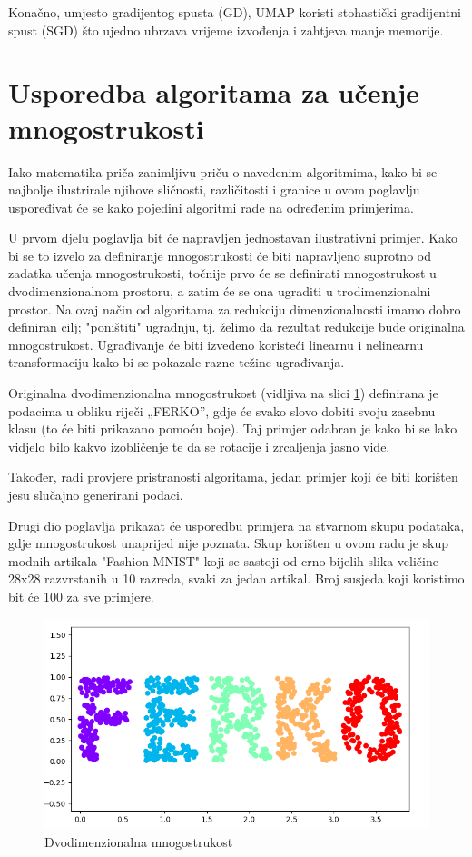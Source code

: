 \documentclass[times, utf8, diplomski]{fer}
\begin{document}
Konačno, umjesto gradijentog spusta (GD), UMAP koristi stohastički gradijentni spust (SGD) što ujedno ubrzava vrijeme izvođenja i zahtjeva manje memorije.

\section{Usporedba algoritama za učenje mnogostrukosti}

Iako matematika priča zanimljivu priču o navedenim algoritmima, kako bi se najbolje ilustrirale njihove sličnosti, različitosti i granice u ovom poglavlju uspoređivat će se kako pojedini algoritmi rade na određenim primjerima.

U prvom djelu poglavlja bit će napravljen jednostavan ilustrativni primjer. Kako bi se to izvelo za definiranje mnogostrukosti će biti napravljeno suprotno od zadatka učenja mnogostrukosti, točnije prvo će se definirati mnogostrukost u dvodimenzionalnom prostoru, a zatim će se ona ugraditi u trodimenzionalni prostor. Na ovaj način od algoritama za redukciju dimenzionalnosti imamo dobro definiran cilj; "poništiti" ugradnju, tj. želimo da rezultat redukcije bude originalna mnogostrukost. Ugrađivanje će biti izvedeno koristeći linearnu i nelinearnu transformaciju kako bi se pokazale razne težine ugrađivanja.

Originalna dvodimenzionalna mnogostrukost (vidljiva na slici \ref{fig:ferko}) definirana je podacima u obliku riječi „FERKO”, gdje će svako slovo dobiti svoju zasebnu klasu (to će biti prikazano pomoću boje). Taj primjer odabran je kako bi se lako vidjelo bilo kakvo izobličenje te da se rotacije i zrcaljenja jasno vide.

Također, radi provjere pristranosti algoritama, jedan primjer koji će biti korišten jesu slučajno generirani podaci.

Drugi dio poglavlja prikazat će usporedbu primjera na stvarnom skupu podataka, gdje mnogostrukost unaprijed nije poznata. Skup korišten u ovom radu je skup modnih artikala "Fashion-MNIST" koji se sastoji od crno bijelih slika veličine 28x28 razvrstanih u 10 razreda, svaki za jedan artikal. Broj susjeda koji koristimo bit će 100 za sve primjere.

\begin{figure}[htb]
    \centering
    \includegraphics[width=12cm]{resources/images/reduction/compare/ferko.png}
    \caption{Dvodimenzionalna mnogostrukost}
    \label{fig:ferko}
\end{figure}
\end{document}
